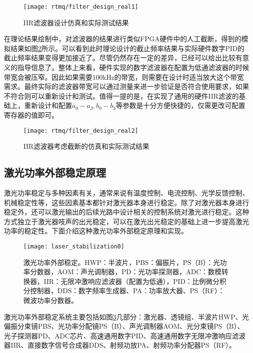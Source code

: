 \begin{figure}
    \centering
    \caption[IIR滤波器设计仿真和实际测试结果]{IIR滤波器设计仿真和实际测试结果\label{fig:filter_design_real1}}
    \texttt{[image: rtmq/filter\_design\_real1]}
\end{figure}

在理论结果绘制中，对滤波器的结果进行类似FPGA硬件中的人工截断，得到的模拟结果如图\ref{fig:filter_design_real2}所示。可以看到此时理论设计的截止频率结果与实际硬件数字PID的截止频率结果变得更加接近了。尽管仍然存在一定的差异，已经可以给出比较有意义的指导信息了。整体上来看，硬件实现的数字滤波器在配置为低通滤波器的时候带宽会被压窄。因此如果需要100kHz的带宽，则需要在设计时适当放大这个带宽需求。最终实际的滤波器带宽可以通过测量来进一步验证是否符合使用要求，如果不符合则可以重新设计和测试。值得一提的是，在实现了通用的硬件IIR滤波的基础上，重新设计和配置$a_0-a_3, b_0-b_3$等参数是十分方便快捷的，仅需更改可配置寄存器的值即可。

\begin{figure}
    \centering
    \caption[IIR滤波器考虑截断的仿真和实际测试结果]{IIR滤波器考虑截断的仿真和实际测试结果\label{fig:filter_design_real2}}
    \texttt{[image: rtmq/filter\_design\_real2]}
\end{figure}

\newpage
\subsection[激光功率外部稳定原理]{激光功率外部稳定原理}
激光功率稳定与多种因素有关，通常来说有温度控制、电流控制、光学反馈控制、机械稳定性等，这些因素基本都针对激光器本身进行稳定。除了对激光器本身进行稳定外，还可以激光输出的后续光路中设计相关的控制系统对激光进行稳定。这种方式独立于激光器吱声的出光稳定，可以在激光出光稳定的基础上进一步提高激光功率的稳定性。下面介绍这种激光功率外部稳定原理和实现。

\begin{figure}
    \centering
    \caption[激光功率外部稳定]{激光功率外部稳定。HWP：半波片，PBS：偏振片，PS（B）：光功率分数器，AOM：声光调制器，PD：光功率探测器，ADC：数模转换器，IIR：无限冲激响应滤波器（配置为低通），PID：比例微分积分控制器，DDS：数字频率生成器、PA：功率放大器、PS（RF）：微波功率分数器。\label{fig:laser_stabilization0}}
    \texttt{[image: laser\_stabilization0]}
\end{figure}

激光功率外部稳定系统主要包括如图\ref{fig:laser_stabilization0}几部分：激光器、透镜组、半波片HWP、光偏振分束镜PBS、光功率分配镜PS（B）、声光调制器AOM、光分束镜PS（B）、光子探测器PD、ADC芯片、高速通用数字PID、高速通用数字无限冲激响应滤波器IIR、直接数字信号合成器DDS、射频功放PA、射频功率分配器PS（RF）。

